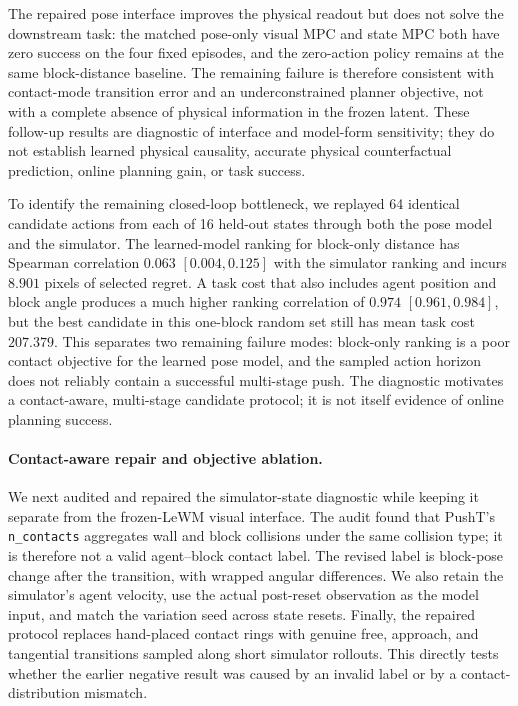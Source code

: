 \documentclass{article}
\begin{document}
The repaired pose interface improves the physical readout but does not solve
the downstream task: the matched pose-only visual MPC and state MPC both have
zero success on the four fixed episodes, and the zero-action policy remains at
the same block-distance baseline. The remaining failure is therefore
consistent with contact-mode transition error and an underconstrained planner
objective, not with a complete absence of physical information in the frozen
latent. These follow-up results are diagnostic of interface and model-form
sensitivity; they do not establish learned physical causality, accurate
physical counterfactual prediction, online planning gain, or task success.

To identify the remaining closed-loop bottleneck, we replayed 64 identical
candidate actions from each of 16 held-out states through both the pose model
and the simulator. The learned-model ranking for block-only distance has
Spearman correlation $0.063$ $[0.004,0.125]$ with the simulator ranking and
incurs $8.901$ pixels of selected regret. A task cost that also includes agent
position and block angle produces a much higher ranking correlation of $0.974$
$[0.961,0.984]$, but the best candidate in this one-block random set still
has mean task cost $207.379$. This separates two remaining failure modes:
block-only ranking is a poor contact objective for the learned pose model, and
the sampled action horizon does not reliably contain a successful multi-stage
push. The diagnostic motivates a contact-aware, multi-stage candidate protocol;
it is not itself evidence of online planning success.

\paragraph{Contact-aware repair and objective ablation.}
We next audited and repaired the simulator-state diagnostic while keeping it
separate from the frozen-LeWM visual interface. The audit found that PushT's
\texttt{n\_contacts} aggregates wall and block collisions under the same
collision type; it is therefore not a valid agent--block contact label. The
revised label is block-pose change after the transition, with wrapped angular
differences. We also retain the simulator's agent velocity, use the actual
post-reset observation as the model input, and match the variation seed across
state resets. Finally, the repaired protocol replaces hand-placed contact
rings with genuine free, approach, and tangential transitions sampled along
short simulator rollouts. This directly tests whether the earlier negative
result was caused by an invalid label or by a contact-distribution mismatch.
\end{document}
